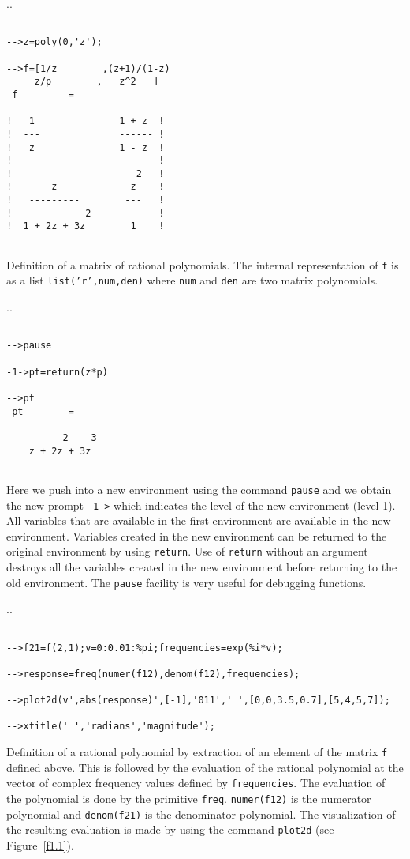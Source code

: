 \noindent.\dotfill.
\begin{verbatim}
 
-->z=poly(0,'z');
 
-->f=[1/z        ,(z+1)/(1-z)
     z/p        ,   z^2   ]
 f         =
 
!   1               1 + z  !
!  ---              ------ !
!   z               1 - z  !
!                          !
!                      2   !
!       z             z    !
!   ---------        ---   !
!             2            !
!  1 + 2z + 3z        1    !
 
\end{verbatim}
Definition of a matrix of rational polynomials.  The internal representation
of {\tt f} is as a list {\tt list('r',num,den)} where {\tt num} and 
{\tt den} are two matrix polynomials.  

\noindent.\dotfill.
\begin{verbatim}
 
-->pause
 
-1->pt=return(z*p)
 
-->pt
 pt        =
 
          2    3  
    z + 2z + 3z   
 
\end{verbatim}
Here we push into a new environment using the command 
{\tt pause}
and we obtain the new prompt {\tt -1->} which indicates the level
of the new environment (level 1).  All variables that are available
in the first environment are available in the new environment.  Variables
created in the new environment can be returned to the original environment
by using {\tt return}.  
Use of {\tt return} without an argument 
destroys all the variables created in the new environment before returning
to the old environment. The {\tt pause} facility is very useful 
for debugging functions.

\noindent.\dotfill.
\begin{verbatim}
 
-->f21=f(2,1);v=0:0.01:%pi;frequencies=exp(%i*v);
 
-->response=freq(numer(f12),denom(f12),frequencies);
 
-->plot2d(v',abs(response)',[-1],'011',' ',[0,0,3.5,0.7],[5,4,5,7]);
 
-->xtitle(' ','radians','magnitude');
\end{verbatim}

Definition of a rational polynomial by extraction of an element
of the matrix {\tt f} defined above.  This is followed by the evaluation
of the rational polynomial at the vector of complex frequency values defined
by {\tt frequencies}.  The evaluation of the polynomial is done by
the primitive {\tt freq}. {\tt numer(f12)} is the numerator
polynomial and {\tt denom(f21)} is the denominator polynomial.
The  visualization of the resulting evaluation
is made by using the command {\tt plot2d} (see Figure~\ref{f1.1}).

